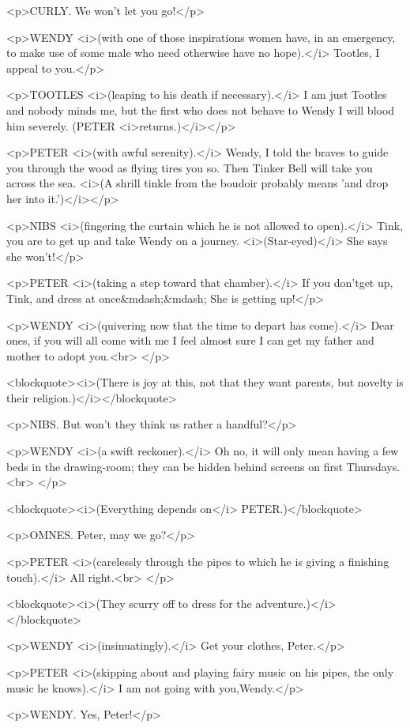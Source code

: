 <p>CURLY. We won't let you go!</p>

<p>WENDY <i>(with one of those inspirations women have, in an
emergency, to make use of some male who need otherwise have no
hope).</i> Tootles, I appeal to you.</p>

<p>TOOTLES <i>(leaping to his death if necessary).</i> I am just
Tootles and nobody minds me, but the first who does not behave to
Wendy I will blood him severely. (PETER <i>returns.)</i></p>

<p>PETER <i>(with awful serenity).</i> Wendy, I told the braves to
guide you through the wood as flying tires you so. Then Tinker Bell
will take you across the sea. <i>(A shrill tinkle from the boudoir
probably means 'and drop her into it.')</i></p>

<p>NIBS <i>(fingering the curtain which he is not allowed to
open).</i> Tink, you are to get up and take Wendy on a journey.
<i>(Star-eyed)</i> She says she won't!</p>

<p>PETER <i>(taking a step toward that chamber).</i> If you don'tget
up, Tink, and dress at once&mdash;&mdash; She is getting up!</p>

<p>WENDY <i>(quivering now that the time to depart has come).</i>
Dear ones, if you will all come with me I feel almost sure I can get
my father and mother to adopt you.<br>
</p>

<blockquote><i>(There is joy at this, not that they want parents, but
novelty is their religion.)</i></blockquote>

<p>NIBS. But won't they think us rather a handful?</p>

<p>WENDY <i>(a swift reckoner).</i> Oh no, it will only mean having a
few beds in the drawing-room; they can be hidden behind screens on
first Thursdays.<br>
</p>

<blockquote><i>(Everything depends on</i> PETER.)</blockquote>

<p>OMNES. Peter, may we go?</p>

<p>PETER <i>(carelessly through the pipes to which he is giving a
finishing touch).</i> All right.<br>
</p>

<blockquote><i>(They scurry off to dress for the
adventure.)</i></blockquote>

<p>WENDY <i>(insinuatingly).</i> Get your clothes, Peter.</p>

<p>PETER <i>(skipping about and playing fairy music on his pipes, the
only music he knows).</i> I am not going with you,Wendy.</p>

<p>WENDY. Yes, Peter!</p>

